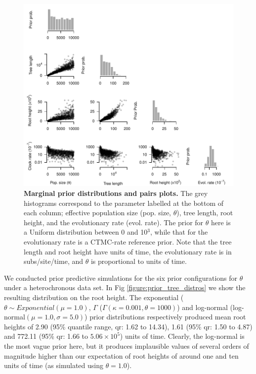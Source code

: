 \documentclass[10pt,letterpaper]{article}
\begin{document}
\begin{figure}[!h]
		\begin{center}
		\includegraphics[width=14.7cm]{sandbox_figures/figure_5.pdf}\newline
		\vspace{-0.5cm}
  \newline
		\caption{\textbf{Marginal prior distributions and pairs plots.} The grey histograms correspond to the parameter labelled at the bottom of each column; effective population size (pop. size, $\theta$), tree length, root height, and the evolutionary rate (evol. rate). The prior for $\theta$ here is a Uniform distribution between 0 and 10$^3$, while that for the evolutionary rate is a CTMC-rate reference prior. Note that the tree length and root height have units of time, the evolutionary rate is in subs/site/time, and $\theta$ is proportional to units of time. }
        \label{figure:correlation_plots}
		\end{center}
\end{figure}

We conducted prior predictive simulations for the six prior configurations for $\theta$ under a heterochronous data set. In Fig \ref{figure:prior_tree_distros} we show the resulting distribution on the root height. The exponential ($\theta \sim Exponential(\mu=1.0)$, $\Gamma$ ($\Gamma(\kappa=0.001, \theta=1000)$) and log-normal (log-normal$(\mu=1.0, \sigma=5.0)$) prior distributions respectively produced mean root heights of 2.90 (95\% quantile range, qr: 1.62 to 14.34), 1.61 (95\% qr: 1.50 to 4.87) and 772.11 (95\% qr: 1.66 to $5.06 \times 10^5$) units of time. Clearly, the log-normal is the most vague prior here, but it produces implausible values of several orders of magnitude higher than our expectation of root heights of around one and ten units of time (as simulated using $\theta=1.0$).
\end{document}
